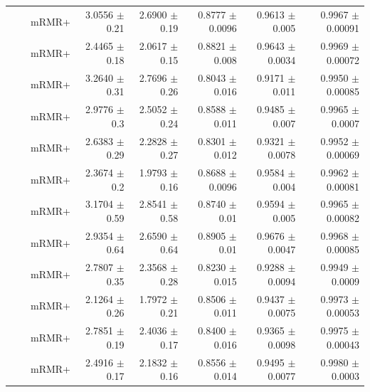 \begin{longtable}{llp{}rrrrr}
 &  & mRMR+ & 3.0556 {\scriptsize $\pm$ 0.21} & 2.6900 {\scriptsize $\pm$ 0.19} & 0.8777 {\scriptsize $\pm$ 0.0096} & 0.9613 {\scriptsize $\pm$ 0.005} & 0.9967 {\scriptsize $\pm$ 0.00091} \\
 &  & mRMR+ & 2.4465 {\scriptsize $\pm$ 0.18} & 2.0617 {\scriptsize $\pm$ 0.15} & 0.8821 {\scriptsize $\pm$ 0.008} & 0.9643 {\scriptsize $\pm$ 0.0034} & 0.9969 {\scriptsize $\pm$ 0.00072} \\
 &  & mRMR+ & 3.2640 {\scriptsize $\pm$ 0.31} & 2.7696 {\scriptsize $\pm$ 0.26} & 0.8043 {\scriptsize $\pm$ 0.016} & 0.9171 {\scriptsize $\pm$ 0.011} & 0.9950 {\scriptsize $\pm$ 0.00085} \\
 &  & mRMR+ & 2.9776 {\scriptsize $\pm$ 0.3} & 2.5052 {\scriptsize $\pm$ 0.24} & 0.8588 {\scriptsize $\pm$ 0.011} & 0.9485 {\scriptsize $\pm$ 0.007} & 0.9965 {\scriptsize $\pm$ 0.0007} \\
 &  & mRMR+ & 2.6383 {\scriptsize $\pm$ 0.29} & 2.2828 {\scriptsize $\pm$ 0.27} & 0.8301 {\scriptsize $\pm$ 0.012} & 0.9321 {\scriptsize $\pm$ 0.0078} & 0.9952 {\scriptsize $\pm$ 0.00069} \\
 &  & mRMR+ & 2.3674 {\scriptsize $\pm$ 0.2} & 1.9793 {\scriptsize $\pm$ 0.16} & 0.8688 {\scriptsize $\pm$ 0.0096} & 0.9584 {\scriptsize $\pm$ 0.004} & 0.9962 {\scriptsize $\pm$ 0.00081} \\
 &  & mRMR+ & 3.1704 {\scriptsize $\pm$ 0.59} & 2.8541 {\scriptsize $\pm$ 0.58} & 0.8740 {\scriptsize $\pm$ 0.01} & 0.9594 {\scriptsize $\pm$ 0.005} & 0.9965 {\scriptsize $\pm$ 0.00082} \\
 &  & mRMR+ & 2.9354 {\scriptsize $\pm$ 0.64} & 2.6590 {\scriptsize $\pm$ 0.64} & 0.8905 {\scriptsize $\pm$ 0.01} & 0.9676 {\scriptsize $\pm$ 0.0047} & 0.9968 {\scriptsize $\pm$ 0.00085} \\
 &  & mRMR+ & 2.7807 {\scriptsize $\pm$ 0.35} & 2.3568 {\scriptsize $\pm$ 0.28} & 0.8230 {\scriptsize $\pm$ 0.015} & 0.9288 {\scriptsize $\pm$ 0.0094} & 0.9949 {\scriptsize $\pm$ 0.0009} \\
 &  & mRMR+ & 2.1264 {\scriptsize $\pm$ 0.26} & 1.7972 {\scriptsize $\pm$ 0.21} & 0.8506 {\scriptsize $\pm$ 0.011} & 0.9437 {\scriptsize $\pm$ 0.0075} & 0.9973 {\scriptsize $\pm$ 0.00053} \\
 &  & mRMR+ & 2.7851 {\scriptsize $\pm$ 0.19} & 2.4036 {\scriptsize $\pm$ 0.17} & 0.8400 {\scriptsize $\pm$ 0.016} & 0.9365 {\scriptsize $\pm$ 0.0098} & 0.9975 {\scriptsize $\pm$ 0.00043} \\
 &  & mRMR+ & 2.4916 {\scriptsize $\pm$ 0.17} & 2.1832 {\scriptsize $\pm$ 0.16} & 0.8556 {\scriptsize $\pm$ 0.014} & 0.9495 {\scriptsize $\pm$ 0.0077} & 0.9980 {\scriptsize $\pm$ 0.0003} \\

\end{longtable}
